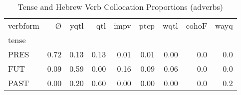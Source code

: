 \begin{table}[htbp!]
\centering
\caption{Tense and Hebrew Verb Collocation Proportions (adverbs)}
\label{table:advb_tense_pr}
\begin{tabular}{lrrrrrrrr}
\toprule
verbform &     Ø &  yqtl &   qtl &  impv &  ptcp &  wqtl &  cohoF &  wayq \\
tense &       &       &       &       &       &       &        &       \\
\midrule
PRES  &  0.72 &  0.13 &  0.13 &  0.01 &  0.01 &  0.00 &    0.0 &   0.0 \\
FUT   &  0.09 &  0.59 &  0.00 &  0.16 &  0.09 &  0.06 &    0.0 &   0.0 \\
PAST  &  0.00 &  0.20 &  0.60 &  0.00 &  0.00 &  0.00 &    0.0 &   0.2 \\
\bottomrule
\end{tabular}
\end{table}
